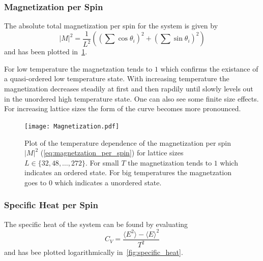 \subsubsection{Magnetization per Spin}\label{sec:magnetization_per_spin}
The absolute total magnetization per spin for the system is given by
\begin{equation}\label{eq:magnetzation_per_spin}
	{\lvert M \rvert}^2 = \frac{1}{L^2} \left( \left( \sum{\cos{\theta_i}} \right)^2 + \left( \sum{\sin{\theta_i}} \right)^2 \right)
\end{equation}
and has been plotted in~\cref{fig:magnetization_per_spin}.

For low temperature the magnetzation tends to $\num{1}$ which confirms the existance of a quasi-ordered low temperature state. With increasing temperature the magnetization decreases steadily at first and then rapdily until slowly levels out in the unordered high temperature state. One can also see  some finite size effects. For increasing lattice sizes the form of the curve becomes more pronounced.
\begin{figure}[!htb]
	\centering
	\texttt{[image: Magnetization.pdf]}
	\caption[Temperature dependence of the magnetzation per spin ${\lvert M \rvert}^2$]{Plot of the temperature dependence of the magnetization per spin ${\lvert M \rvert}^2$ (\cref{eq:magnetzation_per_spin}) for lattice sizes $L\in\{32, 48, \dots, 272\}$. For small $T$ the magnetization tends to $1$ which indicates an ordered state. For big temperatures the magnetzation goes to $0$ which indicates a unordered state.}
	\label{fig:magnetization_per_spin}
\end{figure}

\subsubsection{Specific Heat per Spin}\label{sec:specific_heat_per_spin}
The specific heat of the system can be found by evaluating
\begin{equation}\label{eq:specific_heat_per_spin}
	C_V = \frac{\langle E^2 \rangle - {\langle E \rangle}^2}{T^2}
\end{equation}
and has bee plotted logarithmically in~\cref{fig:specific_heat}.

